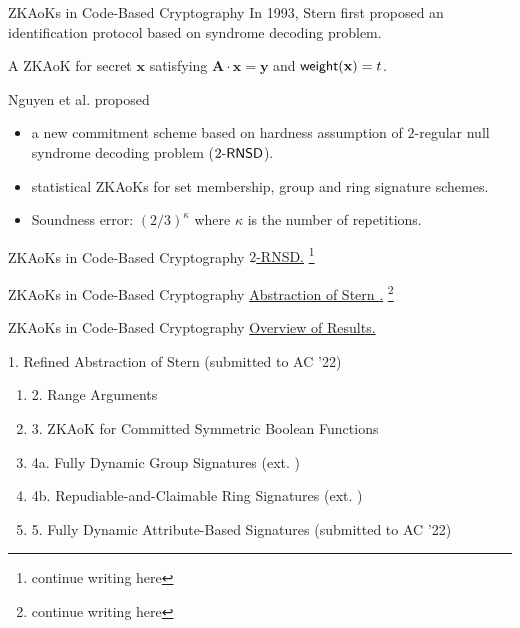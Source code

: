 \begin{frame}{ZKAoKs in Code-Based Cryptography}
	In 1993, Stern first proposed an identification protocol \cite{Stern93} based on syndrome decoding problem.\pause
	
	A ZKAoK for secret $\mathbf{x}$ satisfying $\mathbf{A}\cdot\mathbf{x} = \mathbf{y}$ and $\mathsf{weight}(\mathbf{x}) = t$. \pause
	
	Nguyen et al. \cite{NguyenTWZ19, NguyenTWZ19eprint} proposed \pause
	\begin{itemize}
		\item a new commitment scheme based on hardness assumption of $2$-regular null syndrome decoding problem (${2\textsf{-}\mathsf{RNSD}}$).\pause
		\item statistical ZKAoKs for set membership, group and ring signature schemes.\pause 
		\item Soundness error: $(2/3)^\kappa$ where $\kappa$ is the number of repetitions.
	\end{itemize}
\end{frame}

\begin{frame}{ZKAoKs in Code-Based Cryptography}
	\underline{$2$-RNSD.} \footnote{continue writing here}
\end{frame}
\begin{frame}{ZKAoKs in Code-Based Cryptography}
	\underline{Abstraction of Stern \cite{NguyenTWZ19}.} \footnote{continue writing here}
\end{frame}

\begin{frame}{ZKAoKs in Code-Based Cryptography}
	\underline{Overview of Results.}\pause
	
	{\small 1. Refined Abstraction of Stern (submitted to AC '22)}\pause
	\begin{enumerate}[$\Rightarrow$]
		\item {\small 2. Range Arguments \cite{NguyenTWZ19}}\pause
		\item {\small 3. ZKAoK for Committed Symmetric Boolean Functions \cite{LingNPTW21}}\pause
		\item {\small 4a. Fully Dynamic Group Signatures (ext. \cite{NguyenTWZ19})}\pause
		\item {\small 4b. Repudiable-and-Claimable Ring Signatures (ext. \cite{NguyenTWZ19})}\pause
		\item {\small 5. Fully Dynamic Attribute-Based Signatures (submitted to AC '22)}
	\end{enumerate}
\end{frame}
